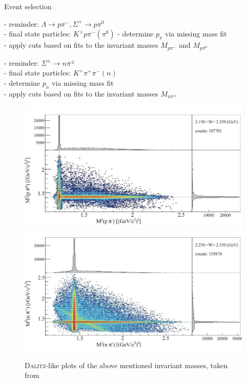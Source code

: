 \documentclass[11pt,aspectratio=1610,dvipsnames]{beamer}
\begin{document}
\begin{frame}{Event selection}
	\centering
	\begin{minipage}{.49\linewidth}
		\begin{tcolorbox}[colback=black!10,colframe=gray!20!black,title=extracting $\Lambda\pi^0$ and $\Sigma^+\pi^-$] 
		- reminder: $\Lambda\to p\pi^-, \Sigma^+\to p\pi^0$\\	
		- final state particles: $K^+p\pi^-(\pi^0)$ 
		- determine $p_\pi$ via missing mass fit\\
		- apply cuts based on fits to the invariant masses $M_{p\pi^-}$ and $M_{p\pi^0}$	
			
			
	\end{tcolorbox}	
\end{minipage}
\begin{minipage}{.49\linewidth}
	\begin{tcolorbox}[colback=black!10,colframe=gray!20!black,title=extracting $\Sigma^+\pi^-$ and $\Sigma^-\pi^+$] 
	- reminder: $\Sigma^\pm\to n\pi^\pm$\\
	- final state particles: $K^+\pi^+\pi^-(n)$\\
	- determine $p_n$ via missing mass fit\\
	- apply cuts based on fits to the invariant masses $M_{n\pi^\pm}$
	\end{tcolorbox}	
\end{minipage}
\begin{figure}[H]
	\centering
	\includegraphics[width=.49\linewidth]{inv_mass_1.jpg}
	\includegraphics[width=.49\linewidth]{inv_mass_2.jpg}
	\caption{\textsc{Dalitz}-like plots of the above mentioned invariant masses, taken from \citet{lineshapes}}
\end{figure}
\end{frame}
\end{document}
